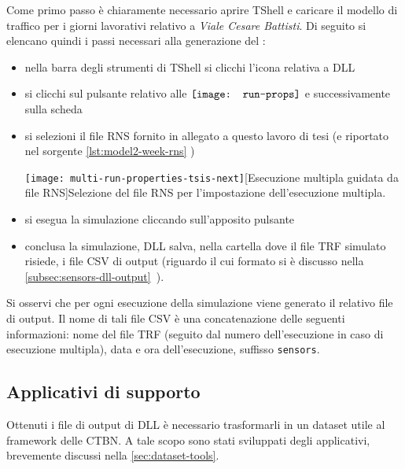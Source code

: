 Come primo passo è chiaramente necessario aprire \acs{TShell} e caricare il modello di traffico per i giorni lavorativi relativo a \emph{Viale Cesare Battisti}. Di seguito si elencano quindi i passi necessari alla generazione del :
\begin{itemize}
	\item nella barra degli strumenti di \acs{TShell} si clicchi l'icona relativa a  \acs{DLL}
	\item si clicchi sul pulsante relativo alle \emph{} $\vcenter{\hbox{\texttt{[image: run-props]}}}$ e successivamente sulla scheda \emph{}
	\item si selezioni il file \acs{RNS} fornito in allegato a questo lavoro di tesi (e riportato nel sorgente \ref{lst:model2-week-rns} )\par
	\begin{minipage}{\linewidth}
		\centering
		\texttt{[image: multi-run-properties-tsis-next]}[Esecuzione multipla guidata da file \acs{RNS}]{Selezione del file \acs{RNS} per l'impostazione dell'esecuzione multipla.}\label{fig:multi-run-properties-tsis-next}
	\end{minipage}
	\item si esegua la simulazione cliccando sull'apposito pulsante
	\item conclusa la simulazione,  \acs{DLL} salva, nella cartella dove il file \acs{TRF} simulato risiede, i file \acs{CSV} di output (riguardo il cui formato si è discusso nella \autoref{subsec:sensors-dll-output}~).
\end{itemize}

Si osservi che per ogni esecuzione della simulazione viene generato il relativo file di output. Il nome di tali file \acs{CSV} è una concatenazione delle seguenti informazioni: nome del file \acs{TRF} (seguito dal numero dell'esecuzione in caso di esecuzione multipla), data e ora dell'esecuzione, suffisso \lstinline[]|sensors|.

\subsection{Applicativi di supporto}
Ottenuti i file di output di  \acs{DLL} è necessario trasformarli in un dataset utile al framework delle \acs{CTBN}. A tale scopo sono stati sviluppati degli applicativi, brevemente discussi nella \vref{sec:dataset-tools}.

